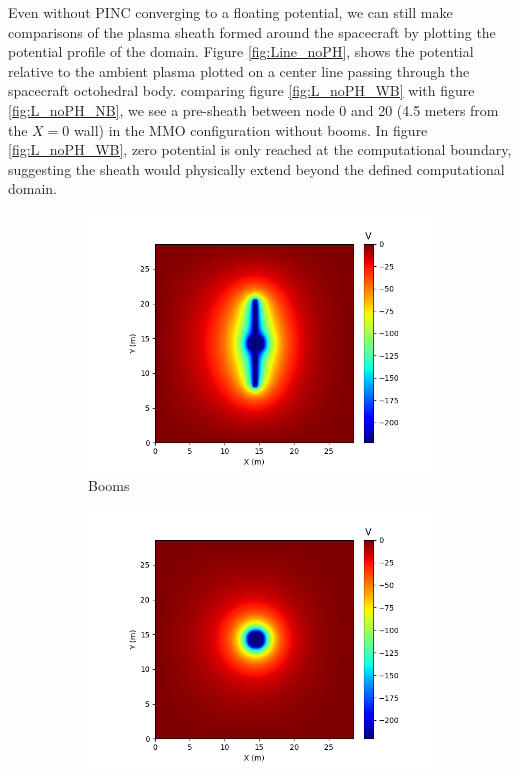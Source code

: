 Even without PINC converging to a floating potential, we can still make comparisons of the plasma sheath formed around the spacecraft by plotting the potential profile of the domain. Figure \ref{fig:Line_noPH}, shows the potential relative to the ambient plasma plotted on a center line passing through the spacecraft octohedral body. comparing figure \ref{fig:L_noPH_WB} with figure \ref{fig:L_noPH_NB}, we see a pre-sheath between node 0 and 20 (4.5 meters from the $X = 0$ wall) in the MMO configuration without booms. In figure \ref{fig:L_noPH_WB}, zero potential is only reached at the computational boundary, suggesting the sheath would physically extend beyond the defined computational domain.   





\begin{center}
\begin{figure}[H]
  \begin{subfigure}[b]{0.61\textwidth}
    \includegraphics[width=\textwidth]{figures/MMO/noPH/WB/P_noPH_WB.png}
    \caption{Booms}
    \label{fig:P_noPH_WB}
  \end{subfigure}
  \hfill
  \begin{subfigure}[b]{0.61\textwidth}
    \includegraphics[width=\textwidth]{figures/MMO/noPH/NB/P_noPH_NB.png}

\end{subfigure}
\end{figure}
\end{center}
